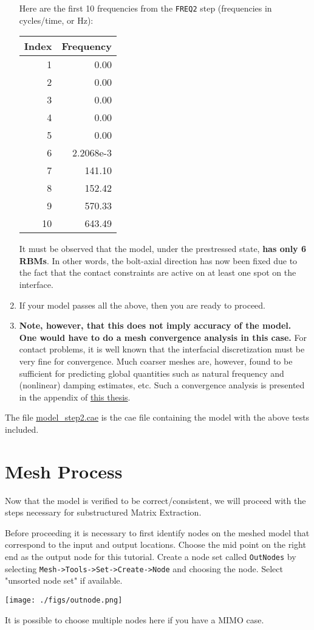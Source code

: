 \documentclass[11pt]{article}
\begin{document}
\begin{enumerate}
Here are the first 10 frequencies from the \texttt{FREQ2} step (frequencies in cycles/time, or Hz):
\begin{center}
\begin{tabular}{rr}
Index & Frequency\\[0pt]
\hline
1 & 0.00\\[0pt]
2 & 0.00\\[0pt]
3 & 0.00\\[0pt]
4 & 0.00\\[0pt]
5 & 0.00\\[0pt]
6 & 2.2068e-3\\[0pt]
7 & 141.10\\[0pt]
8 & 152.42\\[0pt]
9 & 570.33\\[0pt]
10 & 643.49\\[0pt]
\end{tabular}
\end{center}
It must be observed that the model, under the prestressed state, \textbf{has only 6 RBMs}.
In other words, the bolt-axial direction has now been fixed due to the fact that the contact constraints are active on at least one spot on the interface.
\item If your model passes all the above, then you are ready to proceed.
\item \textbf{Note, however, that this does not imply accuracy of the model. One would have to do a mesh convergence analysis in this case.}
For contact problems, it is well known that the interfacial discretization must be very fine for convergence.
Much coarser meshes are, however, found to be sufficient for predicting global quantities such as natural frequency and (nonlinear) damping estimates, etc.
Such a convergence analysis is presented in the appendix of \href{https://scholarship.rice.edu/handle/1911/113700}{this thesis}.
\end{enumerate}

The file \href{https://github.com/Nidish96/Abaqus4Joints/blob/main/assets/assembly/model\_step2.cae}{model\_step2.cae} is the cae file containing the model with the above tests included.
\pagebreak
\section{Mesh Process}
\label{sec:meshproc}
Now that the model is verified to be correct/consistent, we will proceed with the steps necessary for substructured Matrix Extraction.

Before proceeding it is necessary to first identify nodes on the meshed model that correspond to the input and output locations.
Choose the mid point on the right end as the output node for this tutorial.
Create a node set called \texttt{OutNodes} by selecting \texttt{Mesh->Tools->Set->Create->Node} and choosing the node. Select "unsorted node set" if available.
\begin{center}
\texttt{[image: ./figs/outnode.png]}
\end{center}
It is possible to choose multiple nodes here if you have a MIMO case.
\end{document}
